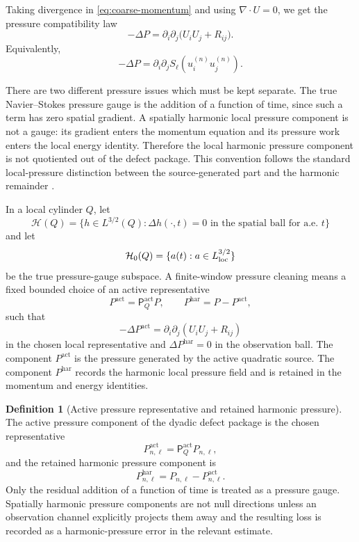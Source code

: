 \documentclass[11pt]{article}
\numberwithin{equation}{section}
\theoremstyle{plain}
\theoremstyle{definition}
\newtheorem{definition}[theorem]{Definition}
\theoremstyle{remark}
\newcommand{\har}{\mathrm{har}}
\newcommand{\calH}{\mathcal H}
\newcommand{\act}{\mathrm{act}}
\begin{document}
Taking divergence in \eqref{eq:coarse-momentum} and using \(\nabla\cdot U=0\), we get the pressure compatibility law
\begin{equation}
  -\Delta P
  =
  \partial_i\partial_j
  \bigl(U_iU_j+R_{ij}\bigr).
  \label{eq:coarse-pressure-poisson}
\end{equation}
Equivalently,
\[
  -\Delta P
  =
  \partial_i\partial_jS_\ell(u_i^{(n)}u_j^{(n)}).
\]

There are two different pressure issues which must be kept separate.  The true Navier--Stokes pressure gauge is the addition of a function of time, since such a term has zero spatial gradient.  A spatially harmonic local pressure component is not a gauge: its gradient enters the momentum equation and its pressure work enters the local energy identity.  Therefore the local harmonic pressure component is not quotiented out of the defect package.  This convention follows the standard local-pressure distinction between the source-generated part and the harmonic remainder \cite{SohrWahl1986,SereginSverak2002,Seregin2015,Wolf2017}.

In a local cylinder \(Q\), let
\[
  \calH(Q)=
  \{h\in L^{3/2}(Q):\Delta h(\cdot,t)=0
  \text{ in the spatial ball for a.e. }t\}
\]
and let
\[
  \calH_0(Q)=\{a(t):a\in L^{3/2}_{\rm loc}\}
\]
be the true pressure-gauge subspace.  A finite-window pressure cleaning means a fixed bounded choice of an active representative
\[
  P^{\act}=\mathsf P_Q^{\act}P,
  \qquad
  P^{\har}=P-P^{\act},
\]
such that
\[
  -\Delta P^{\act}
  =
  \partial_i\partial_j(U_iU_j+R_{ij})
\]
in the chosen local representative and \(\Delta P^{\har}=0\) in the observation ball.  The component \(P^{\act}\) is the pressure generated by the active quadratic source.  The component \(P^{\har}\) records the harmonic local pressure field and is retained in the momentum and energy identities.

\begin{definition}[Active pressure representative and retained harmonic pressure]
The active pressure component of the dyadic defect package is the chosen representative
\[
  P^{\act}_{n,\ell}=\mathsf P_Q^{\act}P_{n,\ell},
\]
and the retained harmonic pressure component is
\[
  P^{\har}_{n,\ell}=P_{n,\ell}-P^{\act}_{n,\ell}.
\]
Only the residual addition of a function of time is treated as a pressure gauge.  Spatially harmonic pressure components are not null directions unless an observation channel explicitly projects them away and the resulting loss is recorded as a harmonic-pressure error in the relevant estimate.
\end{definition}
\end{document}
